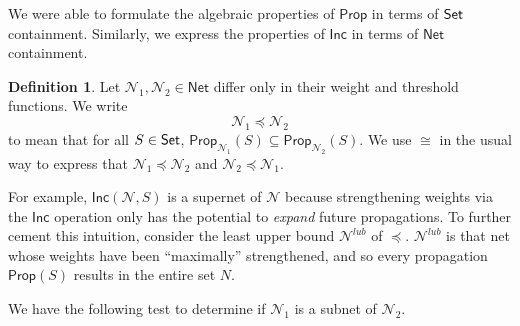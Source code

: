 \documentclass[12pt]{article}
\newcommand{\Set}{\mbox{\sf Set}}
\theoremstyle{definition}
\newtheorem{definition}{Definition}
\newcommand{\Prop}{\textsf{Prop}}
\newcommand{\Inc}{\textsf{Inc}}
\newcommand{\AllNets}{\mathsf{Net}}
\newcommand{\Net}{\mathcal{N}}
\begin{document}
We were able to formulate the algebraic properties of $\Prop$ in terms of $\Set$ containment.  Similarly, we express the properties of $\Inc$ in terms of $\AllNets$ containment.  

\begin{definition}
Let $\Net_1, \Net_2 \in \AllNets$ differ only in their weight and threshold functions.  We write
\[
    \Net_1 \preceq \Net_2
\]
to mean that for all $S \in \Set$, $\Prop_{\Net_1}(S) \subseteq \Prop_{\Net_2}(S)$.  We use $\cong$ in the usual way to express that $\Net_1 \preceq \Net_2$ and $\Net_2 \preceq \Net_1$.
\end{definition}

For example, $\Inc(\Net, S)$ is a supernet of $\Net$ because strengthening weights via the $\Inc$ operation only has the potential to \emph{expand} future propagations.  To further cement this intuition, consider the least upper bound $\mathcal{N}^{lub}$ of $\preceq$.  $\mathcal{N}^{lub}$ is that net whose weights have been ``maximally'' strengthened, and so every propagation $\Prop(S)$ results in the entire set $N$.


We have the following test to determine if $\Net_1$ is a subnet of $\Net_2$.
\end{document}
